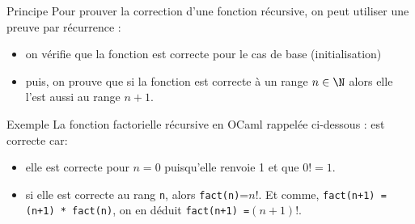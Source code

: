 \documentclass[10pt]{beamer}
\begin{document}
\begin{frame}[fragile]{\Ctitle}{\stitle}
	\begin{block}{Principe}
		Pour prouver la correction d'une fonction récursive, on peut utiliser une preuve par récurrence :
		\begin{itemize}
		\item<2-> on vérifie que la fonction est correcte pour le cas de base (initialisation)
		\item<3-> puis, on prouve que si la fonction est correcte à un range $n \in \N$ alors elle l'est aussi au range $n+1$.
		\end{itemize}
	\end{block}
	{
		\begin{exampleblock}{Exemple}
			La fonction factorielle récursive en OCaml rappelée ci-dessous :
			est correcte car:
			\begin{itemize}
			\item<5-> elle est correcte pour $n=0$ puisqu'elle renvoie 1 et que $0!=1$.
			\item<6-> si elle est correcte au rang {\tt n}, alors {\tt fact(n)}=$n!$. Et comme, {\tt fact(n+1) = (n+1) * fact(n)}, on en déduit {\tt fact(n+1) =}$(n+1)!$.
		\end{itemize}
		\end{exampleblock}
	}
\end{frame}
\end{document}
